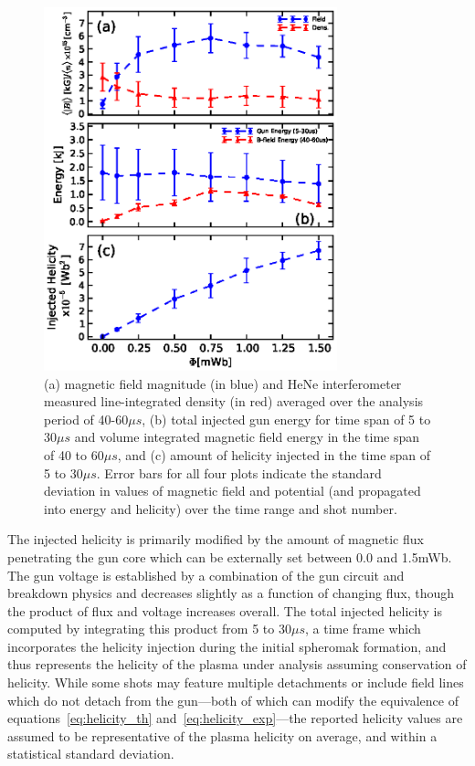 \documentclass[aps,prl,amsmath,amssymb,reprint,superscriptaddress]{revtex4-1} %
\begin{document}
\begin{figure}[!htbp]
\centerline{
\includegraphics[width=8.5cm]{figure1.eps}}
\caption{\label{fig:helicity_scaling} (a) magnetic field magnitude (in blue) and HeNe interferometer measured line-integrated density (in red) averaged over the analysis period of 40-60$\mu s$, (b) total injected gun energy for time span of 5 to 30$\mu s$ and volume integrated magnetic field energy in the time span of 40 to 60$\mu s$, and (c) amount of helicity injected in the time span of 5 to 30$\mu s$. Error bars for all four plots indicate the standard deviation in values of magnetic field and potential (and propagated into energy and helicity) over the time range and shot number.}
\end{figure}

The injected helicity is primarily modified by the amount of magnetic flux penetrating the gun core which can be externally set between 0.0 and 1.5mWb. The gun voltage is established by a combination of the gun circuit and breakdown physics and decreases slightly as a function of changing flux, though the product of flux and voltage increases overall. The total injected helicity is computed by integrating this product from 5 to 30$\mu s$, a time frame which incorporates the helicity injection during the initial spheromak formation, and thus represents the helicity of the plasma under analysis assuming conservation of helicity. While some shots may feature multiple detachments or include field lines which do not detach from the gun---both of which can modify the equivalence of equations~\ref{eq:helicity_th} and~\ref{eq:helicity_exp}---the reported helicity values are assumed to be representative of the plasma helicity on average, and within a statistical standard deviation.
\end{document}
